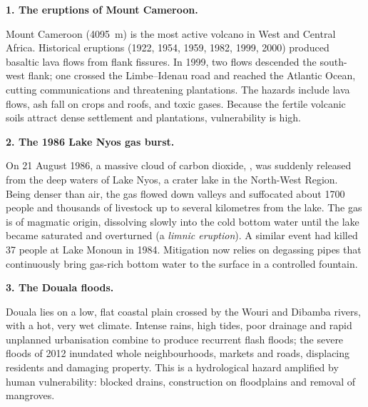 \documentclass[11pt]{article}
\newcounter{popsec}
\newcounter{popsub}
\newcommand{\courssub}[1]{%
  \stepcounter{popsub}%
  \par\vspace{9pt}\noindent{\popxbold\fontsize{11.5}{13}\selectfont\color{popink}{\color{poporange}\thepopsec.\thepopsub}\hspace{6pt}#1}\par\nopagebreak\vspace{4pt}
}
\begin{document}
\courssub{Case Studies from Cameroon}

\textbf{1. The eruptions of Mount Cameroon.}\par
Mount Cameroon (\SI{4095}{m}) is the most active volcano in West and Central Africa. Historical eruptions (1922, 1954, 1959, 1982, 1999, 2000) produced basaltic lava flows from flank fissures. In 1999, two flows descended the south-west flank; one crossed the Limbe--Idenau road and reached the Atlantic Ocean, cutting communications and threatening plantations. The hazards include lava flows, ash fall on crops and roofs, and toxic gases. Because the fertile volcanic soils attract dense settlement and plantations, vulnerability is high.

\textbf{2. The 1986 Lake Nyos gas burst.}\par
On 21 August 1986, a massive cloud of carbon dioxide, , was suddenly released from the deep waters of Lake Nyos, a crater lake in the North-West Region. Being denser than air, the gas flowed down valleys and suffocated about 1700 people and thousands of livestock up to several kilometres from the lake. The gas is of magmatic origin, dissolving slowly into the cold bottom water until the lake became saturated and overturned (a \emph{limnic eruption}). A similar event had killed 37 people at Lake Monoun in 1984. Mitigation now relies on degassing pipes that continuously bring gas-rich bottom water to the surface in a controlled fountain.

\textbf{3. The Douala floods.}\par
Douala lies on a low, flat coastal plain crossed by the Wouri and Dibamba rivers, with a hot, very wet climate. Intense rains, high tides, poor drainage and rapid unplanned urbanisation combine to produce recurrent flash floods; the severe floods of 2012 inundated whole neighbourhoods, markets and roads, displacing residents and damaging property. This is a hydrological hazard amplified by human vulnerability: blocked drains, construction on floodplains and removal of mangroves.
\end{document}
